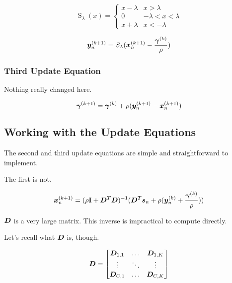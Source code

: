 \documentclass{article}
\begin{document}
\begin{equation}
\operatorname{S}_{\lambda}(x) = \begin{cases}
x - \lambda & x > \lambda \\
0 & -\lambda < x < \lambda \\
x + \lambda & x < - \lambda
\end{cases}
\end{equation}

\begin{equation}
\bm{y}_n^{(k + 1)} = S_{\lambda}(\bm{x}_n^{(k + 1)} - \frac{\bm{\gamma}^{(k)}}{\rho})
\end{equation}

\subsubsection{Third Update Equation}

Nothing really changed here.

\begin{equation}
\bm{\gamma}^{(k + 1)} = \bm{\gamma}^{(k)} + \rho(\bm{y}_n^{(k + 1)} - \bm{x}_n^{(k + 1)})
\end{equation}

\subsection{Working with the Update Equations}

The second and third update equations are simple and straightforward to implement.

The first is not.

\begin{equation}
\bm{x}_n^{(k + 1)} = (\rho{\bf I} + \bm{D}^T\bm{D})^{-1}(\bm{D}^T\bm{s}_n + \rho(\bm{y}_n^{(k)}  + \frac{\bm{\gamma}^{(k)}}{\rho}))
\end{equation}

$\bm{D}$ is a very large matrix. This inverse is impractical to compute directly.

Let's recall what $\bm{D}$ is, though.

\begin{equation}
\begin{aligned}
\bm{D} = \begin{bmatrix} \bm{D}_{1,1} & \hdots & \bm{D}_{1,K} \\
                      \vdots & \ddots & \vdots \\
                      \bm{D}_{C,1} & \hdots & \bm{D}_{C,K}
      \end{bmatrix}
\end{aligned}
\end{equation}
\end{document}
